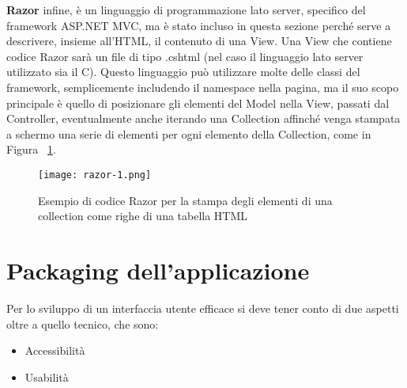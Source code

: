 \textbf{Razor}  infine, è un linguaggio di programmazione lato server, specifico del framework ASP.NET MVC, ma è stato incluso in questa sezione perché serve a descrivere, insieme all'HTML, il contenuto di una View.
Una View che contiene codice Razor sarà un file di tipo .cshtml (nel caso il linguaggio lato server utilizzato sia il C).
Questo linguaggio può utilizzare molte delle classi del framework, semplicemente includendo il namespace nella pagina, ma il suo scopo principale è quello di posizionare gli elementi del Model nella View, passati dal Controller, eventualmente anche iterando una Collection affinché venga stampata a schermo una serie di elementi per ogni elemento della Collection, come in Figura ~\ref{fig:Razor}.

\begin{figure}[H]
    \centering
    \texttt{[image: razor-1.png]}
    \caption{Esempio di codice Razor per la stampa degli elementi di una collection come righe di una tabella HTML}
    \label{fig:Razor}
\end{figure}



\newpage

\section{Packaging dell'applicazione}

Per lo sviluppo di un interfaccia utente efficace si deve tener conto di due aspetti oltre a quello tecnico, che sono:
\begin{itemize}
\item Accessibilità
\item Usabilità
\end{itemize}

